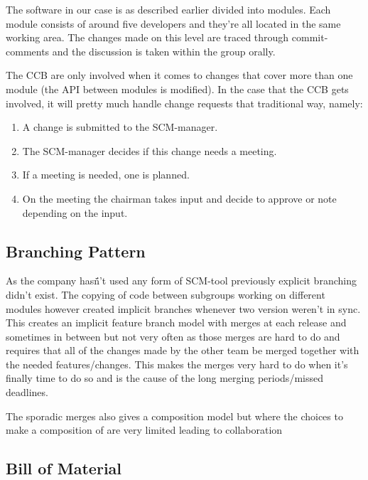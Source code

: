 \documentclass[a4paper,11pt]{article}
\begin{document}
The software in our case is as described earlier divided into modules. Each module consists of around five developers and they're all
located in the same working area. The changes made on this level are traced through commit-comments and the discussion is taken within
the group orally.

The CCB are only involved when it comes to changes that cover more than one module (the API between modules is modified).
In the case that the CCB gets involved, it will pretty much handle change requests that traditional way, namely:

\begin{enumerate}
 \item A change is submitted to the SCM-manager.
 \item The SCM-manager decides if this change needs a meeting.
 \item If a meeting is needed, one is planned.
 \item On the meeting the chairman takes input and decide to approve or note depending on the input.
\end{enumerate}


\subsection{Branching Pattern}

As the company hasn̈́'t used any form of SCM-tool previously explicit branching didn't exist.
The copying of code between subgroups working on different modules however created implicit branches whenever two version weren't in sync. This creates an implicit feature branch model with merges at each release and sometimes in between but not very often as those merges are hard to do and requires that all of the changes made by the other team be merged together with the needed features/changes. This makes the merges very hard to do when it's finally time to do so and is the cause of the long merging periods/missed deadlines.

The sporadic merges also gives a composition model but where the choices to make a composition of are very limited leading to collaboration

\subsection{Bill of Material}
\end{document}
